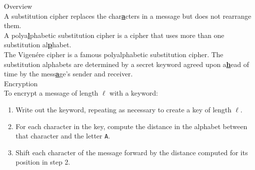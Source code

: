 \begin{minipage}{6cm}\raggedright
\textsf{\LARGE Overview}\\[1.0ex]

A substitution cipher replaces the char\underline{\textbf{a}}cters in a message but does not rearrange them.\\[1.25ex]

A polya\underline{\textbf{l}}phabetic substitution cipher is a cipher that uses more than one substitution al\underline{\textbf{p}}habet.\\[1.25ex]

The Vigen\'ere cipher is a famous polyalphabetic substitution cipher. The substitution alphabets are determined by a secret keyword agreed upon a\underline{\textbf{h}}ead of time by the mess\underline{\textbf{a}}ge's sender and receiver.\\[3ex] 

\textsf{\LARGE Encryption}\\[1.0ex]

To encrypt a message of length $\ell$ with a keyword:
\begin{enumerate}[leftmargin=*]
	\item Write out the keyword, repeating as necessary to create a key of length $\ell$.\\[1.25ex]
	\item For each character in the key, compute the distance in the alphabet between that character and the letter \texttt{A}.
	\item Shift each character of the message forward by the distance computed for its position in step 2. 
\end{enumerate}
%
%
%
%
%
%
\end{minipage}